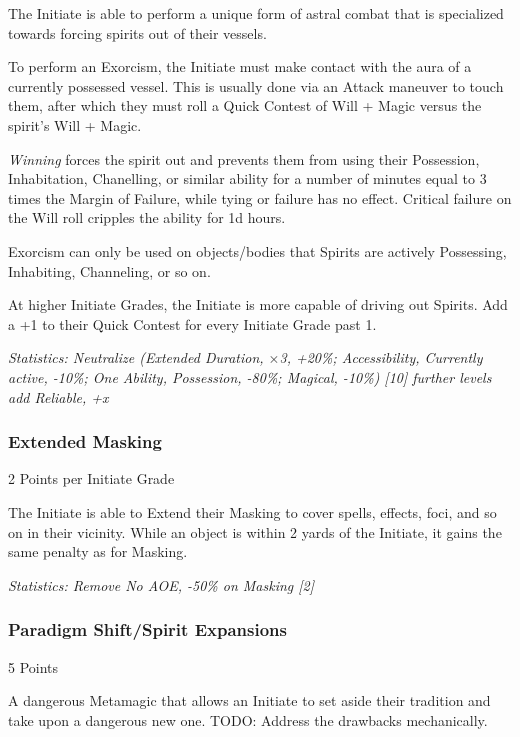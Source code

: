 \begin{multicols*}{3}
	The Initiate is able to perform a unique form of astral combat that is specialized towards forcing spirits out of their vessels. 
	
	To perform an Exorcism, the Initiate must make contact with the aura of a currently possessed vessel. This is usually done via an Attack maneuver to touch them, after which they must roll a Quick Contest of Will + Magic versus the spirit's Will + Magic. 
	
	\textit{Winning} forces the spirit out and prevents them from using their Possession, Inhabitation, Chanelling, or similar ability for a number of minutes equal to 3 times the Margin of Failure, while tying or failure has no effect. Critical failure on the Will roll cripples the ability for 1d hours.
	
	Exorcism can only be used on objects/bodies that Spirits are actively Possessing, Inhabiting, Channeling, or so on.
	
	At higher Initiate Grades, the Initiate is more capable of driving out Spirits. Add a +1 to their Quick Contest for every Initiate Grade past 1.
	
	\textcolor{OliveGreen}{\textit{Statistics: Neutralize (Extended Duration, $\times$3, +20\%; Accessibility, Currently active, -10\%; One Ability, Possession, -80\%; Magical, -10\%) [10] further levels add Reliable, +x }}
	
	\subsubsection{Extended Masking}
	\begin{flushright}
		2 Points per Initiate Grade
	\end{flushright}

	The Initiate is able to Extend their Masking to cover spells, effects, foci, and so on in their vicinity. While an object is within 2 yards of the Initiate, it gains the same penalty as for Masking.
	
	\textcolor{OliveGreen}{\textit{Statistics: Remove No AOE, -50\% on Masking [2] }}
	
	\subsubsection{Paradigm Shift/Spirit Expansions}
	\begin{flushright}
		5 Points
	\end{flushright}

	A dangerous Metamagic that allows an Initiate to set aside their tradition and take upon a dangerous new one. TODO: Address the drawbacks mechanically.
	

\end{multicols*}
